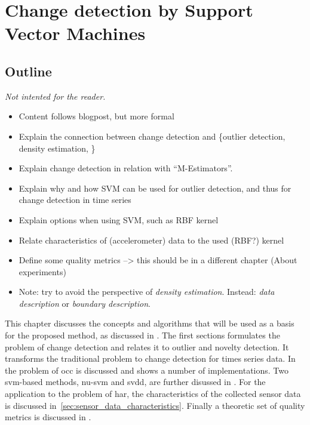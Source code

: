 
\chapter{Change detection by Support Vector Machines}

\label{Chapter3} %


\section{Outline}
\emph{Not intented for the reader.}
\begin{itemize}
  \item Content follows blogpost, but more formal
  \item Explain the connection between change detection and \{outlier detection, density estimation, \etc\}
  \item Explain change detection in relation with ``M-Estimators''.
  \item Explain why and how SVM can be used for outlier detection, and thus for change detection in time series
  \item Explain options when using SVM, such as RBF kernel
  \item Relate characteristics of (accelerometer) data to the used (RBF?) kernel
  \item Define some quality metrics --> this should be in a different chapter (About experiments)
  \item Note: try to avoid the perspective of \emph{density estimation}. Instead: \emph{data description} or \emph{boundary description}.
\end{itemize}

This chapter discusses the concepts and algorithms that will be used as a basis for the proposed method, as discussed in .
The first sections formulates the problem of change detection and relates it to outlier and novelty detection.
It transforms the traditional problem to change detection for times series data.
In  the problem of \acrlong{occ} is discussed and shows a number of implementations.
Two \acrlong{svm}-based methods, \gls{nu-svm} and \gls{svdd}, are further disussed in .
For the application to the problem of \acrlong{har}, the characteristics of the collected sensor data is discussed in~\ref{sec:sensor_data_characteristics}.
Finally a theoretic set of quality metrics is discussed in .






